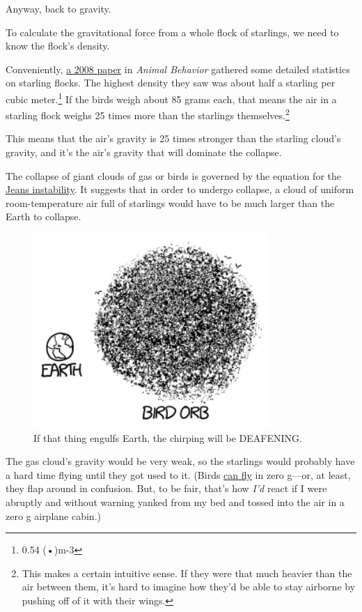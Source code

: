 {{Anyway, back to gravity.}

{To calculate the gravitational force from a whole flock of starlings, we need to know the flock's density.}

{Conveniently, \href{http://arxiv.org/abs/0802.1667}{a 2008 paper} in \emph{Animal Behavior} gathered some detailed statistics on starling flocks. The highest density they saw was about half a starling per cubic meter.{\footnote{0.54 (•)m-3} } If the birds weigh about 85 grams each, that means the air in a starling flock weighs 25 times more than the starlings themselves.{\footnote{This makes a certain intuitive sense. If they were that much heavier than the air between them, it's hard to imagine how they'd be able to stay airborne by pushing off of it with their wings.} } }

{This means that the air's gravity is 25 times stronger than the starling cloud's gravity, and it's the air's gravity that will dominate the collapse.}

{The collapse of giant clouds of gas or birds is governed by the equation for the \href{http://en.wikipedia.org/wiki/Jeans\_instability}{Jeans instability}. It suggests that in order to undergo collapse, a cloud of uniform room-temperature air full of starlings would have to be much larger than the Earth to collapse.}

\begin{figure}[!htbp]
\centering
\includegraphics[scale=0.5, max width=0.8\textwidth]{imgs/a/99/earth.png}
\caption{If that thing engulfs Earth, the chirping will be DEAFENING.}
\end{figure}

{The gas cloud's gravity would be very weak, so the starlings would probably have a hard time flying until they got used to it. (Birds \href{https://www.youtube.com/watch?v=w4sZ3qe6PiI&feature=kp}{can fly} in zero g—or, at least, they flap around in confusion. But, to be fair, that's how \emph{I'd} react if I were abruptly and without warning yanked from my bed and tossed into the air in a zero g airplane cabin.)}

}
